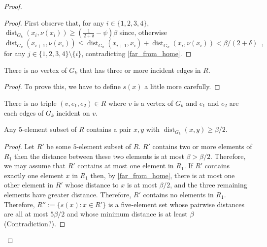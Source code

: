 \documentclass{patmorin}
\DeclareMathOperator{\dist}{dist}
\begin{document}
\begin{proof}
\begin{proof}
    First observe that, for any $i\in\{1,2,3,4\}$,  $\dist_{G_k}(x_i,\nu(x_i)) \ge (\tfrac{1}{2+\delta}-\psi)\beta$ since, otherwise 
    \[  \dist_{G_k}(x_{i+1},\nu(x_i))\le \dist_{G_k}(x_{i+1},x_i) + 
    \dist_{G_k}(x_i,\nu(x_i)) < \beta/(2+\delta) \enspace ,
    \]
    for any $j\in\{1,2,3,4\}\setminus\{i\}$, 
    contradicting \cref{far_from_home}.
    
  \end{proof}

  \begin{clm}
      There is no vertex of $G_k$ that has three or more incident edges in $R$.
  \end{clm}

  \begin{proof}
    To prove this, we have to define $s(x)$ a little more carefully.
  \end{proof}
  
  \begin{clm}
    There is no triple $(v,e_1,e_2)\in R$ where $v$ is a vertex of $G_k$ and $e_1$ and $e_2$ are each edges of $G_k$ incident on $v$.
  \end{clm}

  \begin{clm}
    Any $5$-element subset of $R$ contains a pair $x,y$ with $\dist_{G_k}(x,y)\ge\beta/2$.
  \end{clm}

  \begin{proof}
    Let $R'$ be some $5$-element subset of $R$. $R'$ contains two or more elements of $R_1$ then the distance between these two elements is at most $\beta>\beta/2$.  Therefore, we may assume that $R'$ contains at most one element in $R_1$.  If $R'$ contains exactly one element $x$ in $R_1$ then, by \cref{far_from_home}, there is at most one other element in $R'$ whose distance to $x$ is at most $\beta/2$, and the three remaining elements have greater distance.  Therefore, $R'$ contains no elements in $R_1$.  Therefore, $R'':=\{s(x):x\in R'\}$ is a five-element set whose pairwise distances are all at most $5\beta/2$ and whose minimum distance is at least $\beta$ (Contradiction?).
  \end{proof}


\end{proof}
\end{document}

